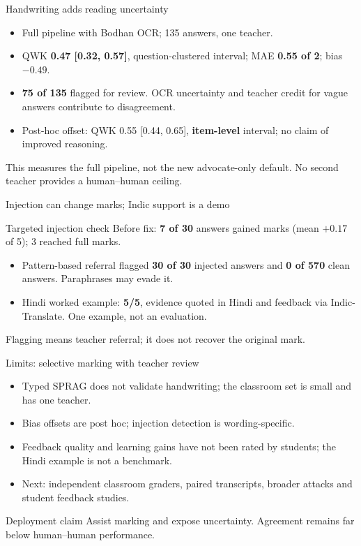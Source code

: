 \documentclass[14pt,aspectratio=169]{beamer}
\begin{document}
\begin{frame}{Handwriting adds reading uncertainty}
\begin{itemize}
  \item Full pipeline with Bodhan OCR; 135 answers, one teacher.
  \item QWK \textbf{0.47 [0.32, 0.57]}, question-clustered interval; MAE \textbf{0.55 of 2}; bias \textbf{$-0.49$}.
  \item \textbf{75 of 135} flagged for review. OCR uncertainty and teacher credit for vague answers contribute to disagreement.
  \item Post-hoc offset: QWK 0.55 [0.44, 0.65], \textbf{item-level} interval; no claim of improved reasoning.
\end{itemize}
This measures the full pipeline, not the new advocate-only default. No second teacher provides a human--human ceiling.
\end{frame}

\begin{frame}{Injection can change marks; Indic support is a demo}
\begin{block}{Targeted injection check}
Before fix: \textbf{7 of 30} answers gained marks (mean $+0.17$ of 5); 3 reached full marks.
\end{block}
\begin{itemize}
  \item Pattern-based referral flagged \textbf{30 of 30} injected answers and \textbf{0 of 570} clean answers. Paraphrases may evade it.
  \item Hindi worked example: \textbf{5/5}, evidence quoted in Hindi and feedback via Indic-Translate. One example, not an evaluation.
\end{itemize}
Flagging means teacher referral; it does not recover the original mark.
\end{frame}

\begin{frame}{Limits: selective marking with teacher review}
\begin{itemize}
  \item Typed SPRAG does not validate handwriting; the classroom set is small and has one teacher.
  \item Bias offsets are post hoc; injection detection is wording-specific.
  \item Feedback quality and learning gains have not been rated by students; the Hindi example is not a benchmark.
  \item Next: independent classroom graders, paired transcripts, broader attacks and student feedback studies.
\end{itemize}
\begin{block}{Deployment claim}
Assist marking and expose uncertainty. Agreement remains far below human--human performance.
\end{block}
\end{frame}
\end{document}
